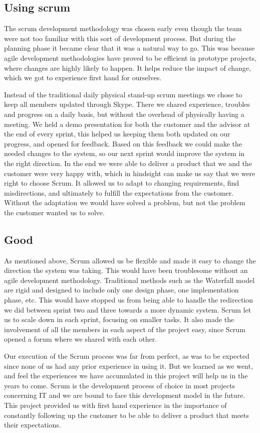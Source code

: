 \subsection*{Using scrum}
The scrum development methodology was chosen early even though the team were not too familiar with this sort of development process. But during the planning phase it became clear that it was a natural way to go. This was because agile development methodologies have proved to be efficient in prototype projects, where changes are highly likely to happen. It helps reduce the impact of change, which we got to experience first hand for ourselves. 

Instead of the traditional daily physical stand-up scrum meetings we chose to keep all members updated through Skype. There we shared experience, troubles and progress on a daily basis, but without the overhead of physically having a meeting. We held a demo presentation for both the customer and the advisor at the end of every sprint, this helped us keeping them both updated on our progress, and opened for feedback. Based on this feedback we could make the needed changes to the system, so our next sprint would improve the system in the right direction. In the end we were able to deliver a product that we and the customer were very happy with, which in hindsight can make us say that we were right to choose Scrum. It allowed us to adapt to changing requirements, find misdirections, and ultimately to fulfill the expectations from the customer. Without the adaptation we would have solved a problem, but not the problem the customer wanted us to solve.

\subsection*{Good}
As mentioned above, Scrum allowed us be flexible and made it easy to change the direction the system was taking. This would have been troublesome without an agile development methodology. Traditional methods such as the Waterfall model are rigid and designed to include only one design phase, one implementation phase, etc. This would have stopped us from being able to handle the redirection we did between sprint two and three towards a more dynamic system. Scrum let us to scale down in each sprint, focusing on smaller tasks. It also made the involvement of all the members in each aspect of the project easy, since Scrum opened a forum where we shared with each other. 

Our execution of the Scrum process was far from perfect, as was to be expected since none of us had any prior experience in using it. But we learned as we went, and feel the experiences we have accumulated in this project will help us in the years to come. Scrum is the development process of choice in most projects concerning IT and we are bound to face this development model in the future. This project provided us with first hand experience in the importance of constantly following up the customer to be able to deliver a product that meets their expectations.

